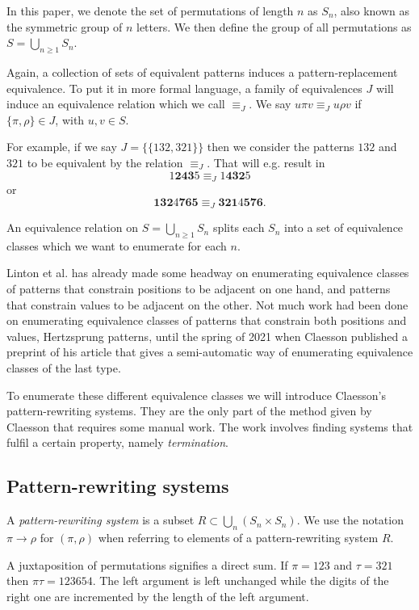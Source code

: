 \documentclass[a4paper, 11pt, english]{article}
\newcommand{\patternrule}{ \to \!}
\theoremstyle{definition}
\newcommand{\Sym}{S}
\begin{document}
In this paper, we denote the set of permutations of length $n$ as $\Sym_n$, also known as the
symmetric group of $n$ letters. We then define the group of all permutations as $\Sym =
\bigcup_{n \geq 1} \Sym_n$.

Again, a collection of sets of equivalent patterns induces a pattern-replacement equivalence.
To put it in more formal language, a family of equivalences $J$ will induce an equivalence relation
which we call $\equiv_J$. We say $u \pi v \equiv_J u \rho v$ if $\{ \pi, \rho \} \in J$, with $u,v
\in \Sym$.

For example, if we say $J = \{ \{ 132, 321 \} \}$ then we consider the patterns $132$ and $321$ to
be equivalent by the relation $\equiv_J$. That will e.g. result in
\[
    1\bm{243}5 \equiv_J 1\bm{432}5
\]
or
\[
  \bm{132}4\bm{765} \equiv_J \bm{321}4\bm{576}.
\]

An equivalence relation on $\Sym = \bigcup_{n \geq 1} \Sym_n$ splits each $\Sym_n$
into a set of equivalence classes which we want to enumerate for each $n$. 

Linton et al. has already made some headway on enumerating equivalence classes of patterns that constrain
positions to be adjacent on one hand, and patterns that constrain values to be adjacent on the other.
Not much work had been done on enumerating equivalence classes of patterns that constrain both
positions and values, Hertzsprung patterns, until the spring of 2021 when Claesson published a
preprint of his article \cite{claesson:2021} that gives a semi-automatic way of enumerating equivalence classes of the
last type.

To enumerate these different equivalence classes we will introduce Claesson's 
pattern-rewriting systems. They are the only part of the method given by Claesson that requires
some manual work. The work involves finding systems that fulfil a certain property, namely
\emph{termination}.

\subsection{Pattern-rewriting systems}
A \emph{pattern-rewriting system} is a subset $R \subset \bigcup_{n} (\Sym_n \times \Sym_n)$.
We use the notation $\pi \patternrule \rho$ for $(\pi, \rho)$ when referring
to elements of a pattern-rewriting system $R$.

A juxtaposition of permutations signifies a direct sum. If $\pi=123$ and
$\tau=321$ then $\pi\tau=123654$. The left argument is left unchanged while the
digits of the right one are incremented by the length of the left argument.
\end{document}
